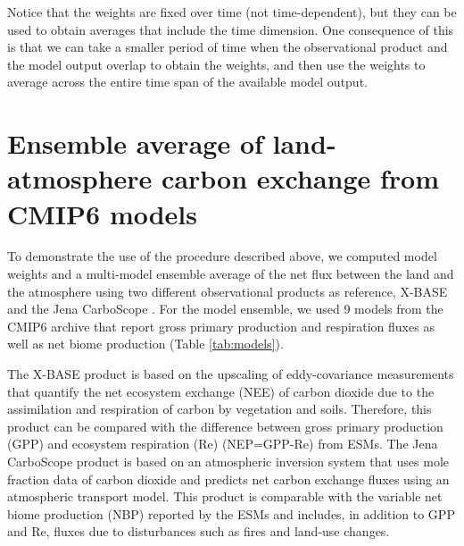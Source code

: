 \documentclass[gmd, manuscript]{copernicus}
\begin{document}

Notice that the weights are fixed over time (not time-dependent), but they can be used to obtain averages that include the time dimension. One consequence of this is that we can take a smaller period of time when the observational product and the model output overlap to obtain the weights, and then use the weights to average across the entire time span of the available model output. 

\section{Ensemble average of land-atmosphere carbon exchange from CMIP6 models}
To demonstrate the use of the procedure described above, we computed model weights and a multi-model ensemble average of the net flux between the land and the atmosphere using two different observational products as reference, X-BASE \citep{Nelson2024} and the Jena CarboScope \citep{Rodenbeck2005}. For the model ensemble, we used 9 models from the CMIP6 archive that report gross primary production and respiration fluxes as well as net biome production (Table \ref{tab:models}).

The X-BASE product is based on the upscaling of eddy-covariance measurements that quantify the net ecosystem exchange (NEE) of carbon dioxide due to the assimilation and respiration of carbon by vegetation and soils. Therefore, this product can be compared with the difference between gross primary production (GPP) and ecosystem respiration (Re) (NEP=GPP-Re) from ESMs. The Jena CarboScope product is based on an atmospheric inversion system that uses mole fraction data of carbon dioxide and predicts net carbon exchange fluxes using an atmospheric transport model. This product is comparable with the variable net biome production (NBP) reported by the ESMs and includes, in addition to GPP and Re, fluxes due to disturbances such as fires and land-use changes. 
\end{document}
